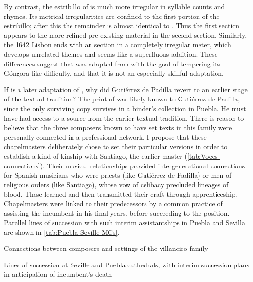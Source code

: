 By contrast, the estribillo of  is much more irregular in
syllable counts and rhymes.
Its metrical irregularities are confined to the first portion of the
estribillo; after this the remainder is almost identical to .
Thus the first section appears  to the more refined
pre-existing material in the second section.
Similarly, the 1642 Lisbon  ends with an  section in
a completely irregular meter, which develops unrelated themes and seems like a
superfluous addition.
These differences suggest that  was adapted from 
with the goal of tempering its Góngora-like difficulty, and that it is not an
especially skillful adaptation.

If  is a later adaptation of , why did Gutiérrez
de Padilla revert to an earlier stage of the textual tradition?
The print of  was likely known to Gutiérrez de Padilla, since
the only surviving copy survives in a binder's collection in Puebla. 
He must have had access to a source from the earlier textual tradition.
There is reason to believe that the three composers known to have set texts in
this family were personally connected in a professional network.
I propose that these chapelmasters deliberately chose to set their particular
versions in order to establish a kind of kinship with Santiago, the earlier
master (\cref{tab:Voces-connections}).
Their musical relationships provided intergenerational connections for Spanish
musicians who were priests (like Gutiérrez de Padilla) or men of religious orders
(like Santiago), whose vow of celibacy precluded lineages of blood. 
These  learned and then transmitted their craft through
apprenticeship.
Chapelmasters were linked to their predecessors by a common practice of
assisting the incumbent in his final years, before succeeding to the position.
Parallel lines of succession with such interim assistantships in Puebla and
Sevilla are shown in \cref{tab:Puebla-Seville-MCs}.

{Connections between composers and settings of the  villancico
family}

{Lines of succession at Seville and Puebla cathedrals, with interim succession
plans in anticipation of incumbent's death}

